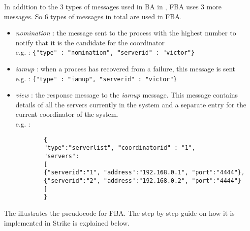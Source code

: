 \documentclass[dareport.tex]{subfiles}
\begin{document}
In addition to the 3 types of messages used in BA in , FBA uses 3 more messages. So 6 types of messages in total are used in FBA.
\begin{itemize}\label{fba-message-types}
	\item \emph{nomination} : the message sent to the process with the highest number to notify that it is the candidate for the coordinator\\
	e.g. : \verb|{"type" : "nomination", "serverid" : "victor"}|
	\item \emph{iamup} : when a process has recovered from a failure, this message is sent\\
	e.g. : \verb|{"type" : "iamup", "serverid" : "victor"}|
	\item \emph{view} : the response message to the \emph{iamup} message. This message contains details of all the servers currently in the system and a separate entry for the current coordinator of the system.\\
	e.g. :
	\begin{small}
		\begin{verbatim}
		{
		"type":"serverlist", "coordinatorid" : "1",
		"servers": 
		[ 	
		{"serverid":"1", "address":"192.168.0.1", "port":"4444"}, 
		{"serverid":"2", "address":"192.168.0.2", "port":"4444"} 
		]
		}
		\end{verbatim}
	\end{small}
\end{itemize}
The  illustrates the pseudocode for FBA. The step-by-step guide on how it is implemented in Strike is explained below.
\end{document}
